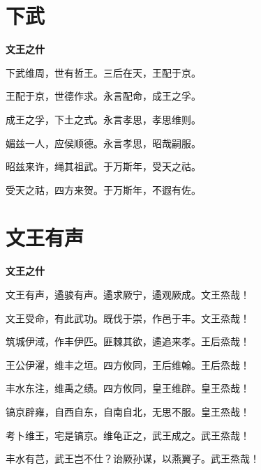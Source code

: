\documentclass[12pt,a4paper]{ctexbook}
\begin{document}
\section{下武}
\textbf{文王之什}\par\vspace{0.5em}
下武维周，世有哲王。三后在天，王配于京。\par
王配于京，世德作求。永言配命，成王之孚。\par
成王之孚，下土之式。永言孝思，孝思维则。\par
媚兹一人，应侯顺德。永言孝思，昭哉嗣服。\par
昭兹来许，绳其祖武。于万斯年，受天之祜。\par
受天之祜，四方来贺。于万斯年，不遐有佐。\par

\section{文王有声}
\textbf{文王之什}\par\vspace{0.5em}
文王有声，遹骏有声。遹求厥宁，遹观厥成。文王烝哉！\par
文王受命，有此武功。既伐于崇，作邑于丰。文王烝哉！\par
筑城伊淢，作丰伊匹。匪棘其欲，遹追来孝。王后烝哉！\par
王公伊濯，维丰之垣。四方攸同，王后维翰。王后烝哉！\par
丰水东注，维禹之绩。四方攸同，皇王维辟。皇王烝哉！\par
镐京辟雍，自西自东，自南自北，无思不服。皇王烝哉！\par
考卜维王，宅是镐京。维龟正之，武王成之。武王烝哉！\par
丰水有芑，武王岂不仕？诒厥孙谋，以燕翼子。武王烝哉！\par
\end{document}

